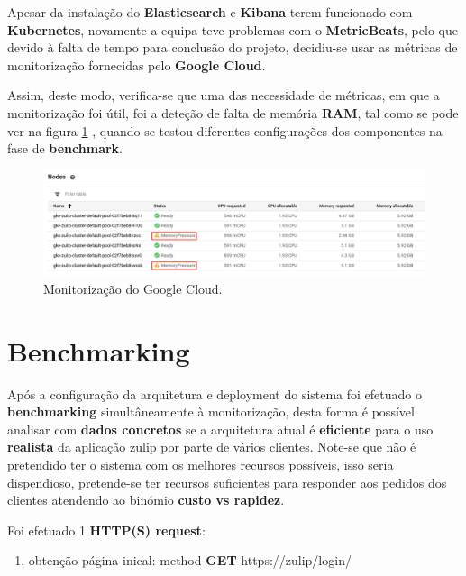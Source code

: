Apesar da instalação do \textbf{Elasticsearch} e \textbf{Kibana} terem funcionado com \textbf{Kubernetes}, novamente a equipa teve problemas com o \textbf{MetricBeats}, pelo que devido à falta de tempo para conclusão do projeto, decidiu-se usar as métricas de monitorização fornecidas pelo \textbf{Google Cloud}.\newline 

Assim, deste modo, verifica-se que uma das necessidade de métricas, em que a monitorização foi útil, foi a deteção de falta de memória \textbf{RAM}, tal como se pode ver na figura \ref{img:monitorizacao} , quando se testou diferentes configurações dos componentes na fase de \textbf{benchmark}. 

\begin{figure}[h!]
\centering
\includegraphics[scale=0.45]{images/monitorizacao.png}
\caption{Monitorização do Google Cloud.}
\label{img:monitorizacao}
\end{figure}

\chapter{Benchmarking}

Após a configuração da arquitetura e deployment do sistema foi efetuado o \textbf{benchmarking} simultâneamente à monitorização, desta forma é possível analisar com \textbf{dados concretos} se a arquitetura atual é \textbf{eficiente} para o uso \textbf{realista} da aplicação zulip por parte de vários clientes. Note-se que não é pretendido ter o sistema com os melhores recursos possíveis, isso seria dispendioso, pretende-se ter recursos suficientes para responder aos pedidos dos clientes atendendo ao binómio \textbf{custo vs rapidez}.
\newline

Foi efetuado 1 \textbf{HTTP(S) request}:

\begin{enumerate}
  \item \label{itm:fst} obtenção página inical: method \textbf{GET} https://zulip/login/
\end{enumerate}

